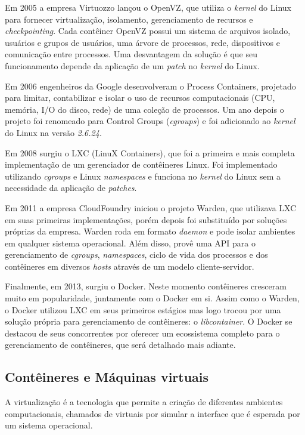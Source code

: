 \documentclass[]{politex}
\begin{document}
	Em 2005 a empresa Virtuozzo lançou o OpenVZ, que utiliza o \textit{kernel} do Linux para fornecer virtualização, isolamento, gerenciamento de recursos e \textit{checkpointing}. Cada contêiner OpenVZ possui um sistema de arquivos isolado, usuários e grupos de usuários, uma árvore de processos, rede, dispositivos e comunicação entre processos. Uma desvantagem da solução é que seu funcionamento depende da aplicação de um \textit{patch} no \textit{kernel} do Linux. \cite{openvz}

	Em 2006 engenheiros da Google desenvolveram o Process Containers, projetado para limitar, contabilizar e isolar o uso de recursos computacionais (CPU, memória, I/O do disco, rede) de uma coleção de processos. Um ano depois o projeto foi renomeado para Control Groups (\textit{cgroups}) e foi adicionado ao \textit{kernel} do Linux na versão \textit{2.6.24}.

	Em 2008 surgiu o LXC (LinuX Containers), que foi a primeira e mais completa implementação de um gerenciador de contêineres Linux. Foi implementado utilizando \textit{cgroups} e Linux \textit{namespaces} e funciona no \textit{kernel} do Linux sem a necessidade da aplicação de \textit{patches}.
	
	Em 2011 a empresa CloudFoundry iniciou o projeto Warden, que utilizava LXC em suas primeiras implementações, porém depois foi substituído por soluções próprias da empresa. Warden roda em formato \textit{daemon} e pode isolar ambientes em qualquer sistema operacional. Além disso, provê uma API para o gerenciamento de \textit{cgroups}, \textit{namespaces}, ciclo de vida dos processos e dos contêineres em diversos \textit{hosts} através de um modelo cliente-servidor.

	Finalmente, em 2013, surgiu o Docker. Neste momento contêineres cresceram muito em popularidade, juntamente com o Docker em si.
	Assim como o Warden, o Docker utilizou LXC em seus primeiros estágios mas logo trocou por uma solução própria para gerenciamento de contêineres: o \textit{libcontainer}.
	O Docker se destacou de seus concorrentes por oferecer um ecossistema completo para o gerenciamento de contêineres, que será detalhado mais adiante.
	
	\subsection{Contêineres e Máquinas virtuais}
	
	A virtualização é a tecnologia que permite a criação de diferentes ambientes computacionais, chamados de virtuais por simular a interface que é esperada por um sistema operacional.
	
\end{document}
